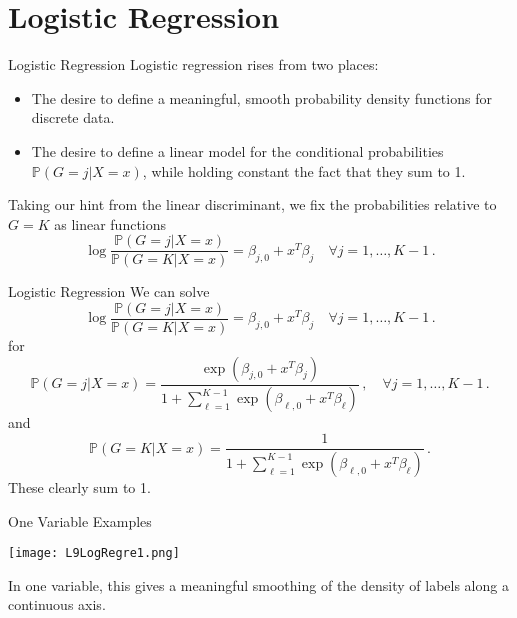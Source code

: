 \documentclass[10pt, table, dvipsnames,xcdraw, handout]{beamer}
\newcommand{\bP}{\ensuremath{\mathbb{P}}}
\begin{document}
\section{Logistic Regression}

\begin{frame}[fragile]{Logistic Regression}
Logistic regression rises from two places:\pause
\begin{itemize}
\item[] The desire to define a meaningful, smooth probability density functions for discrete data.\pause
\item[] The desire to define a linear model for the conditional probabilities $\bP(G = j|X=x)$, while holding constant the fact that they sum to 1. \pause
\end{itemize}
Taking our hint from the linear discriminant, we fix the probabilities relative to $G = K$ as linear functions
$$
\log\frac{\bP(G=j|X=x)}{\bP(G=K|X= x)} = \beta_{j,0} + x^T\beta_j\hspace{1em}\forall j=1,\ldots, K-1\,.
$$

\end{frame}



\begin{frame}[fragile]{Logistic Regression}
We can solve
$$
\log\frac{\bP(G=j|X=x)}{\bP(G=K|X= x)} = \beta_{j,0} + x^T\beta_j\hspace{1em}\forall j=1,\ldots, K-1\,.
$$
for 
$$
\bP(G=j|X=x) = \frac{\exp(\beta_{j,0}+x^T\beta_j)}{1+\sum_{\ell=1}^{K-1}\exp(\beta_{\ell,0} + x^T\beta_\ell)}\,,\hspace{1em} \forall j=1,\ldots, K-1\,.
$$\pause
and
$$
\bP(G=K|X=x)  = \frac{1}{1+\sum_{\ell=1}^{K-1}\exp(\beta_{\ell,0} + x^T\beta_\ell)}\,.
$$\pause
These clearly sum to 1. 

\end{frame}




\begin{frame}[fragile]{One Variable Examples}
  \begin{minipage}[t][0.5\textheight][t]{\textwidth}
	\centering \texttt{[image: L9LogRegre1.png]} 
  \end{minipage}
  \vfill
\begin{minipage}[t][0.5\textheight][t]{\textwidth}
In one variable, this gives a meaningful smoothing of the density of labels along a continuous axis. 

\end{minipage}
\end{frame}
\end{document}
